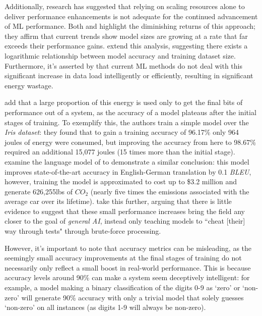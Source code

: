 \documentclass[a4paper, 12pt]{article}
\begin{document}
    Additionally, research has suggested that relying on scaling resources alone to deliver performance enhancements is not adequate for the continued advancement of ML performance. Both  and  highlight the diminishing returns of this approach; they affirm that current trends show model sizes are growing at a rate that far exceeds their performance gains.  extend this analysis, suggesting there exists a logarithmic relationship between model accuracy and training dataset size. Furthermore, it's asserted by  that current ML methods do not deal with this significant increase in data load intelligently or efficiently, resulting in significant energy wastage.

     add that a large proportion of this energy is used only to get the final bits of performance out of a system, as the accuracy of a model plateaus after the initial stages of training. To exemplify this, the authors train a simple model over the \emph{Iris dataset}: they found that to gain a training accuracy of 96.17\% only 964 joules of energy were consumed, but improving the accuracy from here to 98.67\% required an additional 15,077 joules (15 times more than the initial stage).  examine the language model of  to demonstrate a similar conclusion: this model improves state-of-the-art accuracy in English-German translation by 0.1 \emph{BLEU}, however, training the model is approximated to cost up to \$3.2 million and generate 626,255lbs of $CO_2$ (nearly five times the emissions associated with the average car over its lifetime).  take this further, arguing that there is little evidence to suggest that these small performance increases bring the field any closer to the goal of \emph{general AI}, instead only teaching models to ``cheat [their] way through tests" through brute-force processing.

    However, it's important to note that accuracy metrics can be misleading, as the seemingly small accuracy improvements at the final stages of training do not necessarily only reflect a small boost in real-world performance. This is because accuracy levels around 90\% can make a system seem deceptively intelligent: for example, a model making a binary classification of the digits 0-9 as `zero' or `non-zero' will generate 90\% accuracy with only a trivial model that solely guesses `non-zero' on all instances (as digits 1-9 will always be non-zero).
\end{document}

